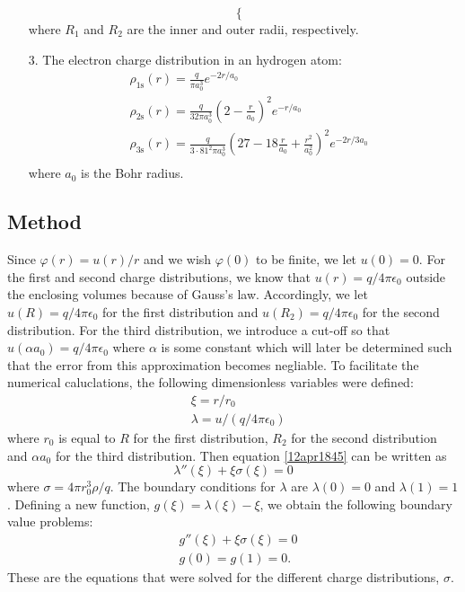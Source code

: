 \documentclass[twocolumn]{article}
\begin{document}
\begin{large}
\begin{itemize}
\begin{equation}
\begin{cases}
        \end{cases}
    \end{equation}
    where $R_1$ and $R_2$ are the inner and outer radii, respectively.
    \item[3.] The electron charge distribution in an hydrogen atom:
    \begin{equation}
        \begin{split}
            &\rho_{1\text{s}}(r) = \frac{q}{\pi a_0^3}e^{-2r/a_0} \\
            &\rho_{2\text{s}}(r) = \frac{q}{32\pi a_0^3}\left(2-\frac{r}{a_0}\right)^2e^{-r/a_0} \\
            &\rho_{3\text{s}}(r) = \frac{q}{3\cdot 81^2\pi a_0^3}\left(27-18\frac{r}{a_0}+\frac{r^2}{a_0^2}\right)^2e^{-2r/3a_0} \\
        \end{split}
    \end{equation}
    where $a_0$ is the Bohr radius.
\end{itemize}


\subsection*{Method}
Since $\varphi(r) = u(r)/r$ and we wish $\varphi(0)$ to be finite, we let $u(0) = 0$. For the first and second charge distributions, we know that $u(r) = q/4\pi\epsilon_0$ outside the enclosing volumes because of Gauss's law. Accordingly, we let $u(R) = q/4\pi\epsilon_0$ for the first distribution and $u(R_2) = q/4\pi\epsilon_0$ for the second distribution. For the third distribution, we introduce a cut-off so that $u(\alpha a_0) = q/4\pi\epsilon_0$ where $\alpha$ is some constant which will later be determined such that the error from this approximation becomes negliable. To facilitate the numerical caluclations, the following dimensionless variables were defined:
\begin{equation}
    \begin{split}
        &\xi = r/r_0 \\ 
        &\lambda = u/(q/4\pi\epsilon_0)
    \end{split}
\end{equation}
where $r_0$ is equal to $R$ for the first distribution, $R_2$ for the second distribution and $\alpha a_0$ for the third distribution. Then equation \eqref{12apr1845} can be written as
\begin{equation}
    \lambda''(\xi) + \xi\sigma(\xi) = 0
\end{equation}
where $\sigma = 4\pi r_0^3\rho/q$. The boundary conditions for $\lambda$ are $\lambda(0) = 0$ and $\lambda(1)=1$. Defining a new function, $g(\xi) = \lambda(\xi) - \xi$, we obtain the following boundary value problems:
\begin{equation}
    \label{17apr0918}
    \begin{split}
        &g''(\xi) + \xi\sigma(\xi) = 0 \\ 
        &g(0) = g(1) = 0.
    \end{split}
\end{equation}
These are the equations that were solved for the different charge distributions, $\sigma$.


\end{large}
\end{document}
